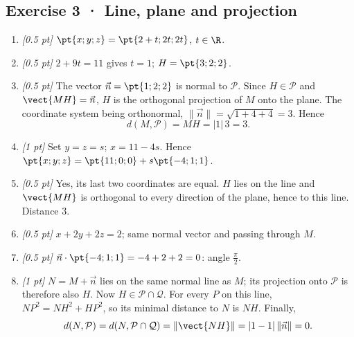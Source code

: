 \subsection*{Exercise 3 · Line, plane and projection}\begin{enumerate}

\item \textit{[0.5 pt]} $\pt{x;y;z}=\pt{2+t;2t;2t}$, $t\in\R$.

\item \textit{[0.5 pt]} $2+9t=11$ gives $t=1$; $H=\pt{3;2;2}$.

\item \textit{[0.5 pt]} The vector $\vec n=\pt{1;2;2}$ is normal to $\mathcal P$. Since $H\in\mathcal P$ and $\vect{MH}=\vec n$, $H$ is the orthogonal projection of $M$ onto the plane. The coordinate system being orthonormal, $\|\vec n\|=\sqrt{1+4+4}=3$. Hence
\[d(M,\mathcal P)=MH=|1|\,3=3.\]

\item \textit{[1 pt]} Set $y=z=s$; $x=11-4s$. Hence $\pt{x;y;z}=\pt{11;0;0}+s\pt{-4;1;1}$.

\item \textit{[0.5 pt]} Yes, its last two coordinates are equal. $H$ lies on the line and $\vect{MH}$ is orthogonal to every direction of the plane, hence to this line. Distance $3$.

\item \textit{[0.5 pt]} $x+2y+2z=2$; same normal vector and passing through $M$.

\item \textit{[0.5 pt]} $\vec n\cdot\pt{-4;1;1}=-4+2+2=0$: angle $\frac{\pi}{2}$.

\item \textit{[1 pt]} $N=M+\vec n$ lies on the same normal line as $M$; its projection onto $\mathcal P$ is therefore also $H$. Now $H\in\mathcal P\cap\mathcal Q$. For every $P$ on this line, $NP^2=NH^2+HP^2$, so its minimal distance to $N$ is $NH$. Finally,
\[d(N,\mathcal P)=d(N,\mathcal P\cap\mathcal Q)=\|\vect{NH}\|=|1-1|\,\|\vec n\|=0.\]

\end{enumerate}

